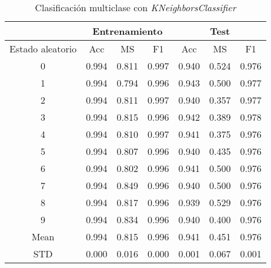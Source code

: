 \begin{table}[th]
	\centering
	\begin{tabular}{ |c|c|c|c|c|c|c| }
		\hline
		\rowcolor{LightCyan}
		 & \multicolumn{3}{c|}{Entrenamiento} & \multicolumn{3}{c|}{Test} \\
		\hline
		\rowcolor{LightCyan}
		 Estado aleatorio & Acc & MS & F1 & Acc & MS & F1 \\
		\hline
		0 & 0.994 & 0.811 & 0.997 & 0.940 & 0.524 & 0.976 \\
		1 & 0.994 & 0.794 & 0.996 & 0.943 & 0.500 & 0.977 \\
		2 & 0.994 & 0.811 & 0.997 & 0.940 & 0.357 & 0.977 \\
		3 & 0.994 & 0.815 & 0.996 & 0.942 & 0.389 & 0.978 \\
		4 & 0.994 & 0.810 & 0.997 & 0.941 & 0.375 & 0.976 \\
		5 & 0.994 & 0.807 & 0.996 & 0.940 & 0.435 & 0.976 \\
		6 & 0.994 & 0.802 & 0.996 & 0.941 & 0.500 & 0.976 \\
		7 & 0.994 & 0.849 & 0.996 & 0.940 & 0.500 & 0.976 \\
		8 & 0.994 & 0.817 & 0.996 & 0.939 & 0.529 & 0.976 \\
		9 & 0.994 & 0.834 & 0.996 & 0.940 & 0.400 & 0.976 \\
		Mean & 0.994 & 0.815 & 0.996 & 0.941 & 0.451 & 0.976 \\
		STD & 0.000 & 0.016 & 0.000 & 0.001 & 0.067 & 0.001 \\
		\hline
	\end{tabular}
	\caption{Clasificación multiclase con \textit{KNeighborsClassifier}}
	\label{tabla:knn_multi}
\end{table}
